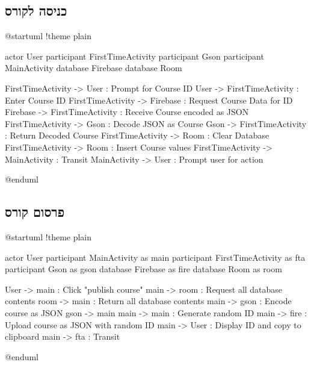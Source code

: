 \subsection{כניסה לקורס}
\begin{FigurePlantUML}
\begin{plantuml}
@startuml
!theme plain

actor User
participant FirstTimeActivity
participant Gson
participant MainActivity
database Firebase
database Room

FirstTimeActivity -> User         : Prompt for Course ID
User -> FirstTimeActivity         : Enter Course ID
FirstTimeActivity -> Firebase     : Request Course Data for ID
Firebase -> FirstTimeActivity     : Receive Course encoded as JSON
FirstTimeActivity -> Gson         : Decode JSON as Course
Gson -> FirstTimeActivity         : Return Decoded Course
FirstTimeActivity -> Room         : Clear Database
FirstTimeActivity -> Room         : Insert Course values
FirstTimeActivity -> MainActivity : Transit
MainActivity -> User              : Prompt user for action

@enduml
\end{plantuml}
\end{FigurePlantUML}

\subsection{פרסום קורס}
\begin{FigurePlantUML}
\begin{plantuml}
@startuml
!theme plain

actor User
participant MainActivity as main
participant FirstTimeActivity as fta
participant Gson as gson
database Firebase as fire
database Room as room

User -> main : Click "publish course"
main -> room : Request all database contents
room -> main : Return all database contents
main -> gson : Encode course as JSON
gson -> main
main -> main : Generate random ID
main -> fire : Upload course as JSON with random ID
main -> User : Display ID and copy to clipboard
main -> fta  : Transit

@enduml
\end{plantuml}
\end{FigurePlantUML}
